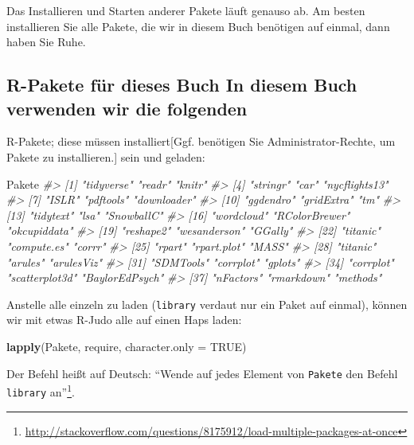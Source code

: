 \documentclass[12pt,]{book}
\makeatletter
\newenvironment{Shaded}{\begin{snugshade}}{\end{snugshade}}
\newcommand{\KeywordTok}[1]{\textcolor[rgb]{0.13,0.29,0.53}{\textbf{{#1}}}}
\newcommand{\DataTypeTok}[1]{\textcolor[rgb]{0.13,0.29,0.53}{{#1}}}
\newcommand{\CommentTok}[1]{\textcolor[rgb]{0.56,0.35,0.01}{\textit{{#1}}}}
\newcommand{\OtherTok}[1]{\textcolor[rgb]{0.56,0.35,0.01}{{#1}}}
\newcommand{\NormalTok}[1]{{#1}}
\newenvironment{kframe}{%
\medskip{}
\setlength{\fboxsep}{.8em}
 \def\at@end@of@kframe{}%
 \ifinner\ifhmode%
  \def\at@end@of@kframe{\end{minipage}}%
  \begin{minipage}{\columnwidth}%
 \fi\fi%
 \def\FrameCommand##1{\hskip\@totalleftmargin \hskip-\fboxsep
 \colorbox{shadecolor}{##1}\hskip-\fboxsep
     \hskip-\linewidth \hskip-\@totalleftmargin \hskip\columnwidth}%
 \MakeFramed {\advance\hsize-\width
   \@totalleftmargin\z@ \linewidth\hsize
   \@setminipage}}%
 {\par\unskip\endMakeFramed%
 \at@end@of@kframe}
\renewenvironment{Shaded}{\begin{kframe}}{\end{kframe}}
\makeatother
\begin{document}
Das Installieren und Starten anderer Pakete läuft genauso ab. Am besten
installieren Sie alle Pakete, die wir in diesem Buch benötigen auf
einmal, dann haben Sie Ruhe.

\subsection{R-Pakete für dieses Buch In diesem Buch verwenden wir die
folgenden}\label{r-pakete-fur-dieses-buch-in-diesem-buch-verwenden-wir-die-folgenden}

R-Pakete; diese müssen installiert{[}Ggf. benötigen Sie
Administrator-Rechte, um Pakete zu installieren.{]} sein und geladen:

\begin{Shaded}
\begin{Highlighting}[]
\NormalTok{Pakete }
\CommentTok{#>  [1] "tidyverse"     "readr"         "knitr"        }
\CommentTok{#>  [4] "stringr"       "car"           "nycflights13" }
\CommentTok{#>  [7] "ISLR"          "pdftools"      "downloader"   }
\CommentTok{#> [10] "ggdendro"      "gridExtra"     "tm"           }
\CommentTok{#> [13] "tidytext"      "lsa"           "SnowballC"    }
\CommentTok{#> [16] "wordcloud"     "RColorBrewer"  "okcupiddata"  }
\CommentTok{#> [19] "reshape2"      "wesanderson"   "GGally"       }
\CommentTok{#> [22] "titanic"       "compute.es"    "corrr"        }
\CommentTok{#> [25] "rpart"         "rpart.plot"    "MASS"         }
\CommentTok{#> [28] "titanic"       "arules"        "arulesViz"    }
\CommentTok{#> [31] "SDMTools"      "corrplot"      "gplots"       }
\CommentTok{#> [34] "corrplot"      "scatterplot3d" "BaylorEdPsych"}
\CommentTok{#> [37] "nFactors"      "rmarkdown"     "methods"}
\end{Highlighting}
\end{Shaded}

Anstelle alle einzeln zu laden (\texttt{library} verdaut nur ein Paket
auf einmal), können wir mit etwas R-Judo alle auf einen Haps laden:

\begin{Shaded}
\begin{Highlighting}[]
\KeywordTok{lapply}\NormalTok{(Pakete, require, }\DataTypeTok{character.only =} \OtherTok{TRUE}\NormalTok{) }
\end{Highlighting}
\end{Shaded}

Der Befehl heißt auf Deutsch: ``Wende auf jedes Element von
\texttt{Pakete} den Befehl \texttt{library} an''\footnote{\url{http://stackoverflow.com/questions/8175912/load-multiple-packages-at-once}}.
\end{document}
